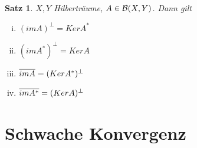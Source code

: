 \documentclass[ngerman]{report}
\theoremstyle{plain}%
\newtheorem{thm}{Satz}[chapter]
\theoremstyle{definition}%
\theoremstyle{myStyle}
\begin{document}
	\begin{thm}
		$X,Y$ Hilberträume, $A\in \BS$. Dann gilt
			\begin{enumerate}[(i)]
				\item $(imA)^\perp = Ker A^*$
				\item $(imA^*)^\perp = Ker A$
				\item $\overline{imA} = (KerA^*)^\perp$
				\item $\overline{imA^*} = (KerA)^\perp$
			\end{enumerate}
	\end{thm}

	\section{Schwache Konvergenz}
\end{document}
